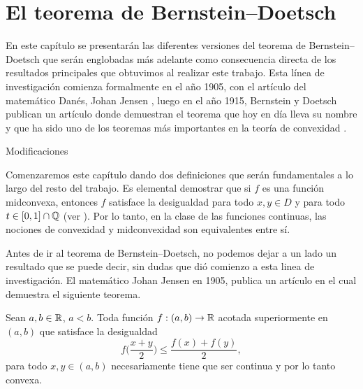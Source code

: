 \chapter{El teorema de Bernstein--Doetsch}
\setcounter{theorem}{0}
\label{chapPrevio}

En este capítulo se presentarán las diferentes versiones 
del teorema de Bernstein--Doetsch que serán englobadas más 
adelante como consecuencia directa de los resultados principales que
obtuvimos al realizar este trabajo. Esta línea de investigación
comienza formalmente en el año 1905, con el artículo del matemático 
Danés, Johan Jensen \cite{Jen06}, luego en el año 1915, Bernstein y Doetsch 
publican un artículo donde demuestran el teorema que hoy en día lleva su nombre 
y que ha sido uno de los teoremas más importantes en la teoría de convexidad \cite{Kuc09}. 

Modificaciones 

Comenzaremos este capítulo dando dos definiciones que serán fundamentales
a lo largo del resto del trabajo.
Es elemental demostrar que si $f$ es una función midconvexa,
entonces $f$ satisface la desigualdad  para todo
$x,y\in D$ y para todo $t\in[0,1]\cap\mathbb{Q}$ (ver \cite{Kuc09}). 
Por lo tanto, en la clase de las funciones continuas, las nociones
de convexidad y midconvexidad son equivalentes entre sí.

Antes de ir al teorema de Bernstein--Doetsch, no podemos dejar a un lado un resultado 
que se puede decir, sin dudas que dió comienzo a esta linea de investigación. 
El matemático Johan Jensen en 1905, 
publica un artículo en el cual demuestra el siguiente teorema. 

\begin{theorem}
\label{TJensenFirst}
Sean $a,b\in\mathbb{R}$, $a<b$. 
Toda función $f:(a,b)\to\mathbb{R}$ acotada superiormente en $(a,b)$ que satisface 
la desigualdad
$$
f\bigg(\frac{x+y}{2}\bigg)\leq \frac{f(x)+f(y)}{2},
$$
para todo $x,y\in (a,b)$ necesariamente tiene que ser continua
y por lo tanto convexa.
\end{theorem}


